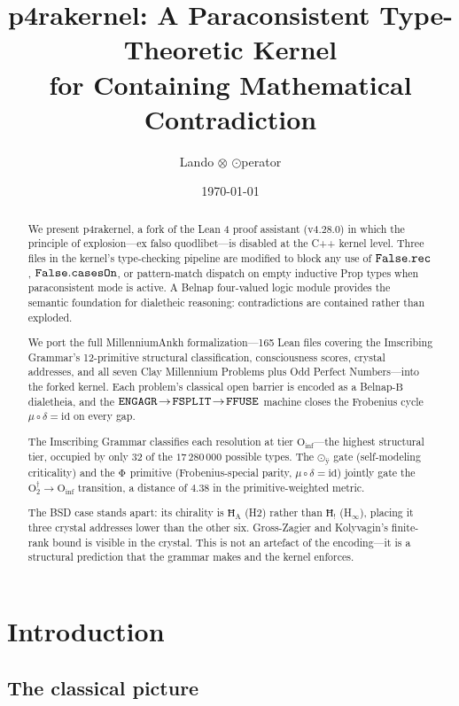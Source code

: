 \documentclass[11pt,a4paper]{article}
\title{p4rakernel: A Paraconsistent Type-Theoretic Kernel\\
       for Containing Mathematical Contradiction}
\author{Lando $\otimes$ $\odot$perator}
\date{\today}
\theoremstyle{definition}
\begin{document}
\maketitle

\begin{abstract}
We present p4rakernel, a fork of the Lean 4 proof assistant (v4.28.0) in which the
principle of explosion---ex falso quodlibet---is disabled at the C++ kernel level.
Three files in the kernel's type-checking pipeline are modified to block any use
of ${\tt False.rec}$, ${\tt False.casesOn}$, or pattern-match dispatch on empty
inductive Prop types when paraconsistent mode is active. A Belnap four-valued logic
module provides the semantic foundation for dialetheic reasoning: contradictions
are contained rather than exploded.

We port the full MillenniumAnkh formalization---165 Lean files covering the
Imscribing Grammar's 12-primitive structural classification, consciousness scores,
crystal addresses, and all seven Clay Millennium Problems plus Odd Perfect
Numbers---into the forked kernel. Each problem's classical open barrier is
encoded as a Belnap-$\text{B}$ dialetheia, and the ${\tt ENGAGR \!\to\! FSPLIT \!\to\! FFUSE}$
machine closes the Frobenius cycle $\mu \circ \delta = \text{id}$ on every gap.

The Imscribing Grammar classifies each resolution at tier
$\text{O}_{\text{inf}}$---the highest structural tier, occupied by only 32 of
the $17\,280\,000$ possible types. The $\text{⊙}_{\text{ÿ}}$ gate
(self-modeling criticality) and the $\text{Φ}_{\text{}}$ primitive
(Frobenius-special parity, $\mu \circ \delta = \text{id}$) jointly gate the
$\text{O}_2^\dagger \to \text{O}_{\text{inf}}$ transition, a distance of
$4.38$ in the primitive-weighted metric.

The BSD case stands apart: its chirality is $\text{Ħ}_{\text{A}}$ (H2) rather
than $\text{Ħ}_{\text{!}}$ (H$_\infty$), placing it three crystal addresses lower
than the other six. Gross-Zagier and Kolyvagin's finite-rank bound is visible in
the crystal. This is not an artefact of the encoding---it is a structural
prediction that the grammar makes and the kernel enforces.
\end{abstract}

\section{Introduction}

\subsection{The classical picture}
\end{document}
